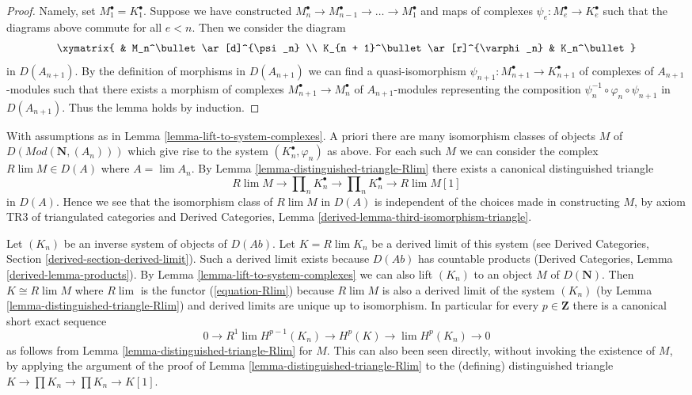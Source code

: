 \begin{proof}
Namely, set $M_1^\bullet = K_1^\bullet$. Suppose
we have constructed
$M_n^\bullet \to M_{n - 1}^\bullet \to \ldots \to M_1^\bullet$
and maps of complexes $\psi_e : M_e^\bullet \to K_e^\bullet$ such that
the diagrams above commute for all $e < n$. Then we consider the diagram
$$
\xymatrix{
& M_n^\bullet \ar[d]^{\psi_n} \\
K_{n + 1}^\bullet \ar[r]^{\varphi_n} & K_n^\bullet
}
$$
in $D(A_{n + 1})$. By the definition of morphisms in $D(A_{n + 1})$ we can
find a quasi-isomorphism
$\psi_{n + 1} : M_{n + 1}^\bullet \to K_{n + 1}^\bullet$
of complexes of $A_{n + 1}$-modules such that there exists a morphism
of complexes $M_{n + 1}^\bullet \to M_n^\bullet$ of $A_{n + 1}$-modules
representing the composition 
$\psi_n^{-1} \circ \varphi_n \circ \psi_{n + 1}$ in $D(A_{n + 1})$.
Thus the lemma holds by induction.
\end{proof}

\begin{remark}
\label{remark-how-unique}
With assumptions as in Lemma \ref{lemma-lift-to-system-complexes}.
A priori there are many isomorphism classes of objects $M$ of
$D(\textit{Mod}(\mathbf{N}, (A_n)))$ which give rise to the system
$(K_n^\bullet, \varphi_n)$ as above. For each such $M$ we can consider the
complex $R\lim M \in D(A)$ where $A = \lim A_n$. By
Lemma \ref{lemma-distinguished-triangle-Rlim}
there exists a canonical distinguished triangle
$$
R\lim M \to \prod\nolimits_n K_n^\bullet \to \prod\nolimits_n K_n^\bullet
\to R\lim M[1]
$$
in $D(A)$. Hence we see that the isomorphism class of $R\lim M$ in
$D(A)$ is independent of the choices made in constructing $M$, by
axiom TR3 of triangulated categories and
Derived Categories, Lemma \ref{derived-lemma-third-isomorphism-triangle}.
\end{remark}

\begin{remark}
\label{remark-compare-derived-limit}
Let $(K_n)$ be an inverse system of objects of $D(\textit{Ab})$.
Let $K = R\lim K_n$ be a derived limit of this system (see
Derived Categories, Section \ref{derived-section-derived-limit}). Such
a derived limit exists because $D(\textit{Ab})$ has countable products
(Derived Categories, Lemma \ref{derived-lemma-products}).
By Lemma \ref{lemma-lift-to-system-complexes} we can also lift
$(K_n)$ to an object $M$ of $D(\mathbf{N})$.
Then $K \cong R\lim M$ where $R\lim$ is the functor (\ref{equation-Rlim})
because $R\lim M$ is also a derived limit of the system $(K_n)$
(by Lemma \ref{lemma-distinguished-triangle-Rlim})
and derived limits are unique up to isomorphism. In particular
for every $p \in \mathbf{Z}$ there is a canonical short exact sequence
$$
0 \to R^1\lim H^{p - 1}(K_n) \to H^p(K) \to \lim H^p(K_n) \to 0
$$
as follows from Lemma \ref{lemma-distinguished-triangle-Rlim} for $M$.
This can also been seen directly, without invoking the existence of $M$,
by applying the argument of the proof of
Lemma \ref{lemma-distinguished-triangle-Rlim} to the (defining)
distinguished triangle $K \to \prod K_n \to \prod K_n \to K[1]$.
\end{remark}

